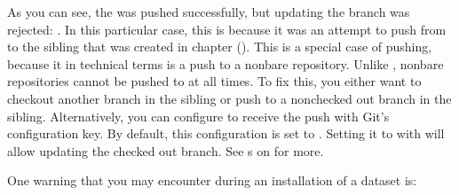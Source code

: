 \sphinxAtStartPar
As you can see, the {\hyperref[\detokenize{glossary:term-git-annex-branch}]{}} was pushed successfully, but updating
the  branch was rejected: .
In this particular case, this is because it was an attempt to push from 
to the  sibling that was created in chapter {\hyperref[\detokenize{basics/basics-collaboration:chapter-collaboration}]{}} ().
This is a special case of pushing, because it \textendash{} in technical terms \textendash{} is a push
to a non\sphinxhyphen{}bare repository. Unlike {\hyperref[\detokenize{glossary:term-bare-Git-repositories}]{}}, non\sphinxhyphen{}bare
repositories cannot be pushed to at all times. To fix this, you either want to
checkout another branch
in the  sibling or push to a non\sphinxhyphen{}checked out branch in the 
sibling. Alternatively, you can configure  to receive the push with
Git’s  configuration key. By default, this configuration
is set to . Setting it to 
with  will allow updating
the checked out branch. See s
on  for more.

\sphinxAtStartPar
{}

\sphinxAtStartPar
One warning that you may encounter during an installation of a dataset is:

\begin{sphinxVerbatim}[commandchars=\\\{\}]
\end{sphinxVerbatim}

